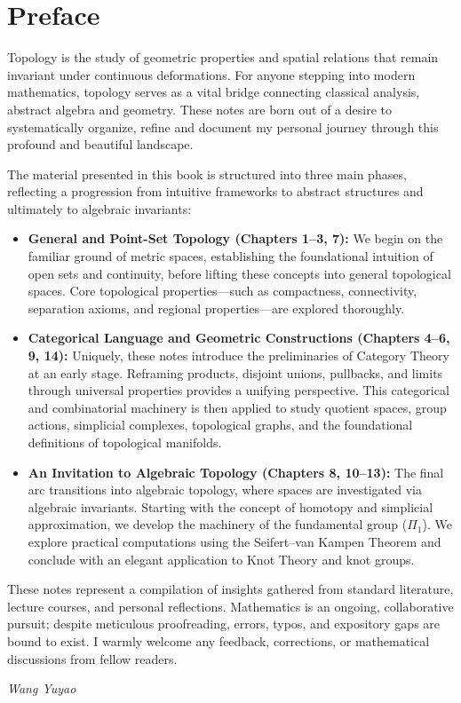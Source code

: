 \chapter*{Preface}


Topology is the study of geometric properties and spatial relations that remain invariant under continuous deformations. For anyone stepping into modern mathematics, topology serves as a vital bridge connecting classical analysis, abstract algebra and geometry. These notes are born out of a desire to systematically organize, refine and document my personal journey through this profound and beautiful landscape.

The material presented in this book is structured into three main phases, reflecting a progression from intuitive frameworks to abstract structures and ultimately to algebraic invariants:

\begin{itemize}
    \item \textbf{General and Point-Set Topology (Chapters 1--3, 7):} We begin on the familiar ground of metric spaces, establishing the foundational intuition of open sets and continuity, before lifting these concepts into general topological spaces. Core topological properties---such as compactness, connectivity, separation axioms, and regional properties---are explored thoroughly.
    \item \textbf{Categorical Language and Geometric Constructions (Chapters 4--6, 9, 14):} Uniquely, these notes introduce the preliminaries of Category Theory at an early stage. Reframing products, disjoint unions, pullbacks, and limits through universal properties provides a unifying perspective. This categorical and combinatorial machinery is then applied to study quotient spaces, group actions, simplicial complexes, topological graphs, and the foundational definitions of topological manifolds.
    \item \textbf{An Invitation to Algebraic Topology (Chapters 8, 10--13):} The final arc transitions into algebraic topology, where spaces are investigated via algebraic invariants. Starting with the concept of homotopy and simplicial approximation, we develop the machinery of the fundamental group ($\Pi_1$). We explore practical computations using the Seifert--van Kampen Theorem and conclude with an elegant application to Knot Theory and knot groups.
\end{itemize}

These notes represent a compilation of insights gathered from standard literature, lecture courses, and personal reflections. Mathematics is an ongoing, collaborative pursuit; despite meticulous proofreading, errors, typos, and expository gaps are bound to exist. I warmly welcome any feedback, corrections, or mathematical discussions from fellow readers.


\begin{flushright}
    \textit{Wang Yuyao}
\end{flushright}